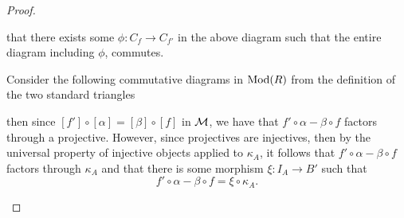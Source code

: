 \begin{proof}
\begin{enumerate}[label={(\bfseries TR\arabic*)}]
{\begin{diagramlabel}[\label{eq:stablemod}]
            \end{diagramlabel}
            that there exists some \( \phi: C_f \to C_{f'} \) in the above diagram such that the entire diagram including \( \phi \), commutes.

            Consider the following commutative diagrams in \( \operatorname{Mod}(R) \) from the definition of the two standard triangles
            \begin{center}
            \end{center}
            then since \( [f'] \circ [\alpha] = [\beta] \circ [f] \) in \( {\mathcal{M}} \), we have that \( f' \circ \alpha - \beta \circ f \) factors through a projective. However, since projectives are injectives, then by the universal property of injective objects applied to \( \kappa_A \), it follows that \( f' \circ \alpha - \beta \circ f \) factors through \( \kappa_A \) and that there is some morphism \( \xi: I_A \to B' \) such that
            \[
                f' \circ \alpha - \beta \circ f = \xi \circ \kappa_A.
            \]

}
\end{enumerate}
\end{proof}
